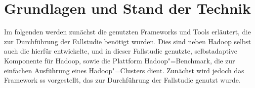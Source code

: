 \chapter{Grundlagen und Stand der Technik}
\label{ch:basics}

Im folgenden werden zunächst die genutzten Frameworks und Tools erläutert, die zur Durchführung der Fallstudie benötigt wurden.
Dies sind neben Hadoop selbst auch die hierfür entwickelte, und in dieser Fallstudie genutzte, selbstadaptive Komponente für Hadoop, sowie die Plattform Hadoop"=Benchmark, die zur einfachen Ausführung eines Hadoop"=Clusters dient.
Zunächst wird jedoch das Framework \acrshort{ss} vorgestellt, das zur Durchführung der Fallstudie genutzt wurde.








